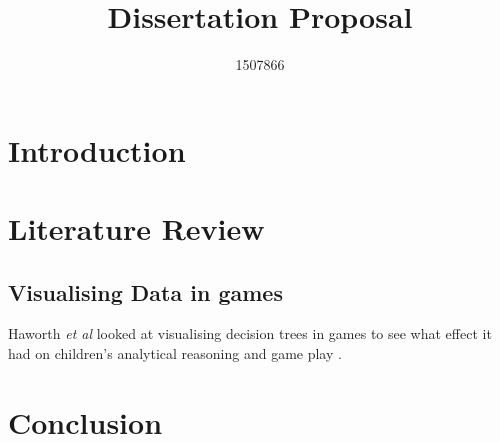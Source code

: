 \documentclass{scrartcl}
\title{Dissertation Proposal }
\author{1507866}
\begin{document}
	
\maketitle

\section{Introduction}

\section{Literature Review}
\subsection{Visualising Data in games}

Haworth \textit{et al} looked at visualising decision trees in games to see what effect it had on children's analytical reasoning and game play \cite{Haworth2010}. 

\section{Conclusion}
 



	
\end{document}
